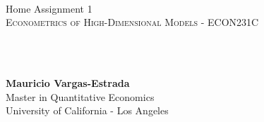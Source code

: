 {
	\parindent0pt
	\ \\ \ \\ \ \\

	\hrulefill
	\vspace{0.0cm}
	\begin{spacing}{1.1}
	{	
		\flushleft
		\fontsize{22pt}{44pt}\selectfont 
		Home Assignment 1
	}\\
	\textsc{Econometrics of High-Dimensional Models - ECON231C}
	\end{spacing}

	\ \\ \ \\
	{
		\textbf{Mauricio Vargas-Estrada}\\
		Master in Quantitative Economics\\
		University of California - Los Angeles\par
	}
	\ \\

	\hrulefill
}

